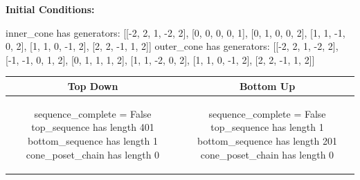 \documentclass[10pt]{article}
\begin{document}
\textbf{Initial Conditions:}
\begin{SAGE}
inner_cone has generators: 
[[-2, 2, 1, -2, 2], [0, 0, 0, 0, 1], [0, 1, 0, 0, 2], [1, 1, -1, 0, 2], [1, 1, 0, -1, 2], [2, 2, -1, 1, 2]]
outer_cone has generators: 
[[-2, 2, 1, -2, 2], [-1, -1, 0, 1, 2], [0, 1, 1, 1, 2], [1, 1, -2, 0, 2], [1, 1, 0, -1, 2], [2, 2, -1, 1, 2]]

\end{SAGE}
\begin{tabular}{c|c}
\textbf{Top Down} & \textbf{Bottom Up} \\ \hline  
\begin{SAGE}
sequence_complete = False
top_sequence has length 401
bottom_sequence has length 1
cone_poset_chain has length 0
\end{SAGE} 
&
\begin{SAGE}
sequence_complete = False
top_sequence has length 1
bottom_sequence has length 201
cone_poset_chain has length 0
\end{SAGE} 
\\ \hline


\end{tabular}
\end{document}

